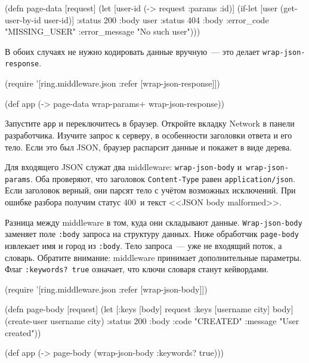 \begin{english}
  \begin{clojure}
(defn page-data [request]
  (let [user-id (-> request :params :id)]
    (if-let [user (get-user-by-id user-id)]
      {:status 200 :body user}
      {:status 404
       :body {:error_code "MISSING_USER"
              :error_message "No such user"}})))
  \end{clojure}
\end{english}

\noindent
В обоих случаях не нужно кодировать данные вручную~--- это делает
\verb|wrap-json-response|.

\begin{english}
  \begin{clojure}
(require '[ring.middleware.json
           :refer [wrap-json-response]])

(def app (-> page-data
             wrap-params+
             wrap-json-response))
  \end{clojure}
\end{english}

Запустите \verb|app| и переключитесь в браузер. Откройте вкладку Network в
панели разработчика. Изучите запрос к серверу, в особенности заголовки ответа и
его тело. Если это был JSON, браузер распарсит данные и покажет в виде дерева.

Для входящего JSON служат два middleware: \verb|wrap-json-body|
и~\verb|wrap-json-params|. Оба проверяют, что заголовок \verb|Content-Type|
равен \verb|application/json|. Если заголовок верный, они парсят тело с учётом
возможных исключений. При ошибке разбора получим статус 400~и текст <<JSON body
malformed>>.

Разница между middleware в том, куда они складывают
данные. \verb|Wrap-json-body| заменяет поле \verb|:body| запроса на
структуру данных. Ниже обработчик \verb|page-body| извлекает имя и город из
\verb|:body|. Тело запроса~--- уже не входящий поток, а словарь. Обратите
внимание: middleware принимает дополнительные параметры. Флаг \verb|:keywords? true|
означает, что ключи словаря станут кейвордами.

\begin{english}
  \begin{clojure}
(require '[ring.middleware.json :refer [wrap-json-body]])

(defn page-body [request]
  (let [{:keys [body]} request
        {:keys [username city]} body]
    (create-user username city)
    {:status 200
     :body {:code "CREATED"
            :message "User created"}}))

(def app (-> page-body
             (wrap-json-body {:keywords? true})))
  \end{clojure}
\end{english}

